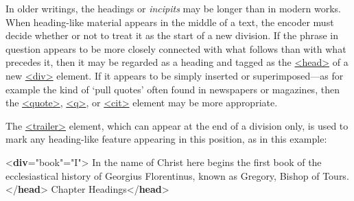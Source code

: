 In older writings, the headings or \textit{incipits} may be longer than in modern works. When heading-like material appears in the middle of a text, the encoder must decide whether or not to treat it as the start of a new division. If the phrase in question appears to be more closely connected with what follows than with what precedes it, then it may be regarded as a heading and tagged as the \hyperref[TEI.head]{<head>} of a new \hyperref[TEI.div]{<div>} element. If it appears to be simply inserted or superimposed—as for example the kind of ‘pull quotes’ often found in newspapers or magazines, then the \hyperref[TEI.quote]{<quote>}, \hyperref[TEI.q]{<q>}, or \hyperref[TEI.cit]{<cit>} element may be more appropriate.\par
The \hyperref[TEI.trailer]{<trailer>} element, which can appear at the end of a division only, is used to mark any heading-like feature appearing in this position, as in this example: \par\bgroup{}\exampleFont \begin{shaded}\noindent\mbox{}{<\textbf{div}\hspace*{1em}{type}="{book}"\hspace*{1em}{n}="{I}">}\mbox{}\newline 
{}In the name of Christ here begins the\mbox{}\newline 
\hspace*{1em}\hspace*{1em} first book of the ecclesiastical history of Georgius Florentinus,\mbox{}\newline 
\hspace*{1em}\hspace*{1em} known as Gregory, Bishop of Tours.{</\textbf{head}>}\mbox{}\newline 
{}\mbox{}\newline 
\hspace*{1em}Chapter Headings{</\textbf{head}>}\mbox{}\newline 

\end{shaded}
